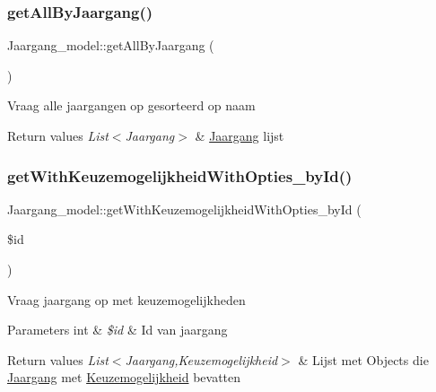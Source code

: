 \subsubsection{\texorpdfstring{get\+All\+By\+Jaargang()}{getAllByJaargang()}}
{\footnotesize\ttfamily Jaargang\+\_\+model\+::get\+All\+By\+Jaargang (\begin{DoxyParamCaption}{ }\end{DoxyParamCaption})}

Vraag alle jaargangen op gesorteerd op naam 
\begin{DoxyRetVals}{Return values}
{\em List$<$\+Jaargang$>$} & \mbox{\hyperlink{class_jaargang}{Jaargang}} lijst \\
\hline
\end{DoxyRetVals}
\mbox{\label{class_jaargang__model_a99ab50dc52b431939edc5db85b857bc6}} 
\subsubsection{\texorpdfstring{get\+With\+Keuzemogelijkheid\+With\+Opties\+\_\+by\+Id()}{getWithKeuzemogelijkheidWithOpties\_byId()}}
{\footnotesize\ttfamily Jaargang\+\_\+model\+::get\+With\+Keuzemogelijkheid\+With\+Opties\+\_\+by\+Id (\begin{DoxyParamCaption}\item[{}]{\$id }\end{DoxyParamCaption})}

Vraag jaargang op met keuzemogelijkheden 
\begin{DoxyParams}[1]{Parameters}
int & {\em \$id} & Id van jaargang \\
\hline
\end{DoxyParams}

\begin{DoxyRetVals}{Return values}
{\em List$<$\+Jaargang,Keuzemogelijkheid$>$} & Lijst met Objects die \mbox{\hyperlink{class_jaargang}{Jaargang}} met \mbox{\hyperlink{class_keuzemogelijkheid}{Keuzemogelijkheid}} bevatten \\
\hline
\end{DoxyRetVals}
\mbox{\label{class_jaargang__model_a18ab753f7cf3d830f513979cff49e2b8}} 

